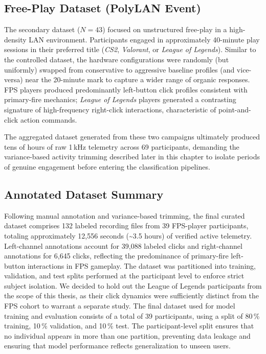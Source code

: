 \subsection{Free-Play Dataset (PolyLAN Event)}
The secondary dataset ($N=43$) focused on unstructured free-play in a high-density LAN environment. Participants engaged in approximately 40-minute play sessions in their preferred title (\textit{CS2}, \textit{Valorant}, or \textit{League of Legends}). Similar to the controlled dataset, the hardware configurations were randomly (but uniformly) swapped from conservative to aggressive baseline profiles (and vice-versa) near the 20-minute mark to capture a wider range of organic responses. FPS players produced predominantly left-button click profiles consistent with primary-fire mechanics; \textit{League of Legends} players generated a contrasting signature of high-frequency right-click interactions, characteristic of point-and-click action commands.

The aggregated dataset generated from these two campaigns ultimately produced tens of hours of raw 1\,kHz telemetry across 69 participants, demanding the variance-based activity trimming described later in this chapter to isolate periods of genuine engagement before entering the classification pipelines.

\subsection{Annotated Dataset Summary}
Following manual annotation and variance-based trimming, the final curated dataset comprises 132 labeled recording files from 39 FPS-player participants, totaling approximately 12,556 seconds (\textasciitilde3.5 hours) of verified active telemetry. Left-channel annotations account for 39,088 labeled clicks and right-channel annotations for 6,645 clicks, reflecting the predominance of primary-fire left-button interactions in FPS gameplay. The dataset was partitioned into training, validation, and test splits performed at the participant level to enforce strict subject isolation. We decided to hold out the League of Legends participants from the scope of this thesis, as their click dynamics were sufficiently distinct from the FPS cohort to warrant a separate study. The final dataset used for model training and evaluation consists of a total of 39 participants, using a split of 80\,\% training, 10\,\% validation, and 10\,\% test. The participant-level split ensures that no individual appears in more than one partition, preventing data leakage and ensuring that model performance reflects generalization to unseen users.

